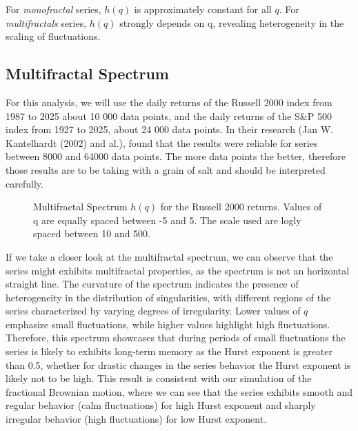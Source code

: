 \documentclass[11pt]{extarticle}
\begin{document}
For \emph{monofractal} series, $h(q)$ is approximately constant for all $q$.
For \emph{multifractals} series, $h(q)$ strongly depends on q, revealing heterogeneity in the scaling of fluctuations.

\subsection{Multifractal Spectrum}

For this analysis, we will use the daily returns of the Russell 2000 index from 1987 to 2025 about 10 000 data points,
and the daily returns of the S\&P 500 index from 1927 to 2025, about 24 000 data points. In their research
(Jan W. Kantelhardt (2002) and al.), found that the results were reliable for series between 8000 and 64000 data points.
The more data points the better, therefore those results are to be taking with a grain of salt and should be interpreted carefully.

\begin{figure}[htbp]
    \centering
    \caption{Multifractal Spectrum $h(q)$ for the Russell 2000 returns. Values of q are equally spaced between -5 and 5.
    The scale used are logly spaced between 10 and 500.}
\end{figure}

\FloatBarrier

If we take a closer look at the multifractal spectrum, we can observe that the series might exhibits multifractal
properties, as the spectrum is not an horizontal straight line.
The curvature of the spectrum indicates the presence of heterogeneity in the distribution of singularities, with
different regions of the series characterized by varying degrees of irregularity.
Lower values of $q$ emphasize small fluctuations, while higher values highlight high fluctuations.
Therefore, this spectrum showcases that during periods of small fluctuations the series is likely to exhibits long-term
memory as the Hurst exponent is greater than 0.5, whether for drastic changes in the series behavior the Hurst exponent
is likely not to be high.
This result is consistent with our simulation of the fractional Brownian motion, where we can see that the
series exhibits smooth and regular behavior (calm fluctuations) for high Hurst exponent and sharply irregular behavior
(high fluctuations) for low Hurst exponent.
\end{document}
